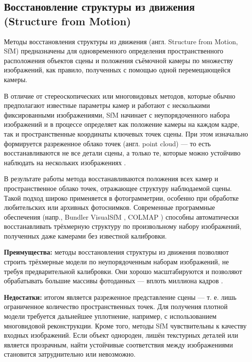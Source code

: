 \subsection{Восстановление структуры из движения (Structure from Motion)}

Методы восстановления структуры из движения (англ. Structure from Motion,
 SfM) предназначены для одновременного определения пространственного
расположения объектов сцены и положения съёмочной камеры по множеству
изображений, как правило, полученных с помощью одной перемещающейся камеры.

В отличие от стереоскопических или многовидовых методов, которые обычно
предполагают известные параметры камер и работают с несколькими фиксированными
изображениями, SfM начинает с неупорядоченного
набора изображений и в процессе определяет как положение камеры на каждом кадре,
так и пространственные координаты ключевых точек сцены. При этом изначально
формируется разреженное облако точек (англ. point cloud) — то есть восстанавливаются не все детали
сцены, а только те, которые можно устойчиво наблюдать на нескольких
изображениях \cite{10.1109/CVPR.2016.4454}.

В результате работы метода восстанавливаются положения всех камер и
пространственное облако точек, отражающее структуру наблюдаемой сцены. Такой
подход широко применяется в фотограмметрии, особенно при обработке любительских
или архивных фотоснимков. Современные программные обеспечения (напр., Bundler
\cite{10.1145/3596711.3596766} VisualSfM \cite{10.1109/3DV.2013.25}, COLMAP \cite{schoenberger2016mvs})
способны автоматически восстанавливать трёхмерную структуру по произвольному
набору изображений, полученных даже камерами без известной калибровки.

\textbf{Преимущества:} методы восстановления структуры из движения позволяют
строить трёхмерные модели по неупорядоченным наборам изображений, не требуя
предварительной калибровки. Они хорошо масштабируются и позволяют обрабатывать
большие массивы фотоданных — вплоть миллиона кадров \cite{10.1109/CVPR.2015.7298949}.

\textbf{Недостатки:} итогом является разреженное представление сцены — т. е.
лишь ограниченное количество пространственных точек. Для получения плотной модели
требуется дальнейшее уплотнение, например, с использованием многовидовой
реконструкции. Кроме того, методы SfM чувствительны к качеству входных
изображений. Если объект однороден, лишён текстурных деталей или является
прозрачным, найти устойчивые соответствия между изображениями становится
затруднительно или невозможно.

